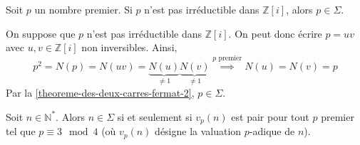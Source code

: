 	\begin{lemma}
		\label{theoreme-des-deux-carres-fermat-4}
		Soit $p$ un nombre premier. Si $p$ n'est pas irréductible dans $\mathbb{Z}[i]$, alors $p \in \Sigma$.
	\end{lemma}

	\begin{demonstration}
		On suppose que $p$ n'est pas irréductible dans $\mathbb{Z}[i]$. On peut donc écrire $p = uv$ avec $u, v \in \mathbb{Z}[i]$ non inversibles. Ainsi,
		\[ p^2 = N(p) = N(uv) = \underbrace{N(u)}_{\neq 1} \underbrace{N(v)}_{\neq 1} \overset{p \text{ premier}}{\implies} N(u) = N(v) = p \]
		Par la \cref{theoreme-des-deux-carres-fermat-2}, $p \in \Sigma$.
	\end{demonstration}

	\begin{theorem}
		Soit $n \in \mathbb{N}^*$. Alors $n \in \Sigma$ si et seulement si $v_p(n)$ est pair pour tout $p$ premier tel que $p \equiv 3 \mod 4$ (où $v_p(n)$ désigne la valuation $p$-adique de $n$).
	\end{theorem}

